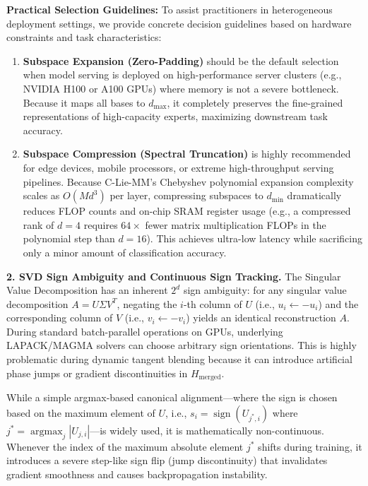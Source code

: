 \textbf{Practical Selection Guidelines:} To assist practitioners in heterogeneous deployment settings, we provide concrete decision guidelines based on hardware constraints and task characteristics:
\begin{enumerate}
    \item \textbf{Subspace Expansion (Zero-Padding)} should be the default selection when model serving is deployed on high-performance server clusters (e.g., NVIDIA H100 or A100 GPUs) where memory is not a severe bottleneck. Because it maps all bases to $d_{\max}$, it completely preserves the fine-grained representations of high-capacity experts, maximizing downstream task accuracy.
    \item \textbf{Subspace Compression (Spectral Truncation)} is highly recommended for edge devices, mobile processors, or extreme high-throughput serving pipelines. Because C-Lie-MM's Chebyshev polynomial expansion complexity scales as $O(M d^3)$ per layer, compressing subspaces to $d_{\min}$ dramatically reduces FLOP counts and on-chip SRAM register usage (e.g., a compressed rank of $d=4$ requires $64\times$ fewer matrix multiplication FLOPs in the polynomial step than $d=16$). This achieves ultra-low latency while sacrificing only a minor amount of classification accuracy.
\end{enumerate}

\textbf{2. SVD Sign Ambiguity and Continuous Sign Tracking.}
The Singular Value Decomposition has an inherent $2^d$ sign ambiguity: for any singular value decomposition $A = U \Sigma V^T$, negating the $i$-th column of $U$ (i.e., $u_i \leftarrow -u_i$) and the corresponding column of $V$ (i.e., $v_i \leftarrow -v_i$) yields an identical reconstruction $A$. During standard batch-parallel operations on GPUs, underlying LAPACK/MAGMA solvers can choose arbitrary sign orientations. This is highly problematic during dynamic tangent blending because it can introduce artificial phase jumps or gradient discontinuities in $H_{\text{merged}}$.

While a simple argmax-based canonical alignment---where the sign is chosen based on the maximum element of $U$, i.e., $s_i = \operatorname{sign}(U_{j^*, i})$ where $j^* = \operatorname{argmax}_j |U_{j, i}|$---is widely used, it is mathematically non-continuous. Whenever the index of the maximum absolute element $j^*$ shifts during training, it introduces a severe step-like sign flip (jump discontinuity) that invalidates gradient smoothness and causes backpropagation instability. 


